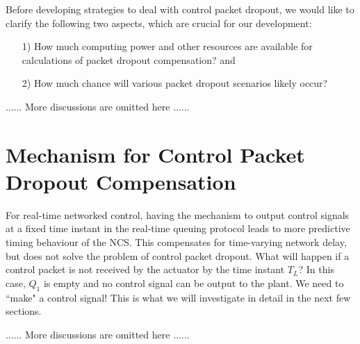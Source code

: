 Before developing strategies to deal with control packet dropout, we would like to clarify the following two aspects, which are crucial for our development:
\begin{enumerate}
\baselineskip
\item[1)] How much computing power and other resources are available for calculations of packet dropout compensation? and
\item[2)] How much chance will various packet dropout scenarios likely occur? 
\end{enumerate}

...... More discussions are omitted here ......


\section[Mechanism for Packet Dropout Compensation]{Mechanism for Control Packet Dropout Compensation}

For real-time networked control, having the mechanism to output control signals at a fixed time instant in the real-time queuing protocol leads to more predictive timing behaviour of the NCS. This compensates for time-varying network delay, but does not solve the problem of control packet dropout. What will happen if a control packet is not received by the actuator by the time instant $T_L$? In this case, $Q_1$ is empty and no control signal can be output to the plant. We need to ``make" a control signal! This is what we will investigate in detail in the next few sections.

...... More discussions are omitted here ......